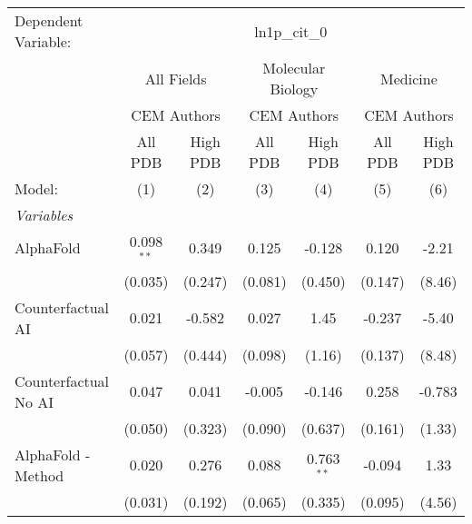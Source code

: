 \begingroup
\centering
\begin{tabular}{lcccccc}
   \tabularnewline \midrule \midrule
   Dependent Variable: & \multicolumn{6}{c}{ln1p\_cit\_0}\\
 & \multicolumn{2}{c}{All Fields} & \multicolumn{2}{c}{Molecular Biology} & \multicolumn{2}{c}{Medicine} \\
\cmidrule(lr){2-3} \cmidrule(lr){4-5} \cmidrule(lr){6-7}
 & \multicolumn{2}{c}{CEM Authors} & \multicolumn{2}{c}{CEM Authors} & \multicolumn{2}{c}{CEM Authors} \\
\cmidrule(lr){2-3} \cmidrule(lr){4-5} \cmidrule(lr){6-7}
 & \multicolumn{1}{c}{All PDB} & \multicolumn{1}{c}{High PDB} & \multicolumn{1}{c}{All PDB} & \multicolumn{1}{c}{High PDB} & \multicolumn{1}{c}{All PDB} & \multicolumn{1}{c}{High PDB} \\
\cmidrule(lr){2-2} \cmidrule(lr){3-3} \cmidrule(lr){4-4} \cmidrule(lr){5-5} \cmidrule(lr){6-6} \cmidrule(lr){7-7}
   Model:                                                     & (1)            & (2)        & (3)           & (4)          & (5)            & (6)\\  
   \midrule
   \emph{Variables}\\
   AlphaFold                                                  & 0.098$^{**}$   & 0.349      & 0.125         & -0.128       & 0.120          & -2.21\\   
                                                              & (0.035)        & (0.247)    & (0.081)       & (0.450)      & (0.147)        & (8.46)\\   
   Counterfactual AI                                          & 0.021          & -0.582     & 0.027         & 1.45         & -0.237         & -5.40\\   
                                                              & (0.057)        & (0.444)    & (0.098)       & (1.16)       & (0.137)        & (8.48)\\   
   Counterfactual No AI                                       & 0.047          & 0.041      & -0.005        & -0.146       & 0.258          & -0.783\\   
                                                              & (0.050)        & (0.323)    & (0.090)       & (0.637)      & (0.161)        & (1.33)\\   
   AlphaFold - Method                                         & 0.020          & 0.276      & 0.088         & 0.763$^{**}$ & -0.094         & 1.33\\   
                                                              & (0.031)        & (0.192)    & (0.065)       & (0.335)      & (0.095)        & (4.56)\\   

\end{tabular}
